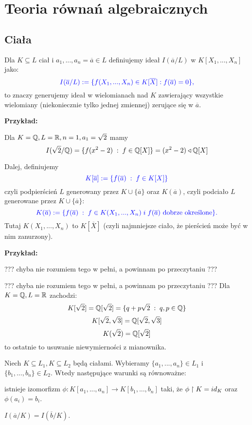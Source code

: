 \section{Teoria równań algebraicznych}

\subsection{Ciała}

Dla $K\subseteq L$ ciał i $a_1,...,a_n=\overline a\in L$ definiujemy ideał $I({\overline a}/L)$ w $K[X_1,...,X_n]$ jako:
$$\color{blue}I(\overline a /L):=\{f(X_1,...,X_n)\in K[\overline X]:f(\overline a)=0\},$$
to znaczy generujemy ideał w wielomianach nad $K$ zawierający wszystkie wielomiany (niekoniecznie tylko jednej zmiennej) zerujące się w $\overline a$. 
\medskip

\textbf{Przykład:}
\smallskip

Dla $K=\mathbb{Q},L=\mathbb{R},n=1,a_1=\sqrt{2}$ mamy
$$I(\sqrt{2}/\mathbb{Q})=\{f(x^2-2)\;:\;f\in\mathbb{Q}[X]\}=(x^2-2)\triangleleft \mathbb{Q}[X]$$

Dalej, definiujemy
$$\color{blue}K[\overline a]:=\{f(\overline a)\;:\;f\in K[X]\}$$
czyli podpierścień $L$ generowany przez $K\cup\{\overline a\}$ oraz $K(\overline a)$, czyli podciało $L$ generowane przez $K\cup\{\overline a\}$:
$$\color{blue}K(\overline a):=\{f(\overline a)\;:\;f\in K(X_1,...,X_n)\;i\;f(\overline a)\text{ dobrze określone}\}.$$
Tutaj $K(X_1,...,X_n)$ to  $K[\overline X]$ (czyli najmniejsze ciało, że pierścień może być w nim zanurzony).
\medskip

\textbf{Przykład:}
\smallskip

{\color{red}\large ??? chyba nie rozumiem tego w pełni, a powinnam po przeczytaniu ???}
\smallskip

??? chyba nie rozumiem tego w pełni, a powinnam po przeczytaniu ???
Dla $K=\mathbb{Q},L=\mathbb{R}$ zachodzi:
$$K[\sqrt2]=\mathbb{Q}[\sqrt2]=\{q+p\sqrt2\;:\;q,p\in\mathbb{Q}\}$$
$$K[\sqrt2,\sqrt3]=\mathbb{Q}[\sqrt2,\sqrt3]$$
$$K(\sqrt2)=\mathbb{Q}[\sqrt2]$$
to ostatnie to usuwanie niewymierności z mianownika.
\medskip

\textbf{\large{}} Niech $K\subseteq L_1,K\subseteq L_2$ będą ciałami. Wybieramy $\{a_1,...,a_n\}\in L_1$ i $\{b_1,...,b_n\}\in L_2$. Wtedy następujące warunki są równoważne:

\indent \point istnieje izomorfizm $\phi:K[a_1,...,a_n]\to K[b_1,...,b_n]$ taki, że $\phi\upharpoonright K=id_K$ oraz $\phi(a_i)=b_i$.

\indent \point $I(\overline a/K)=I(\overline b/K)$.
\smallskip

